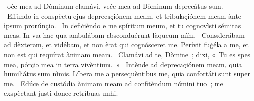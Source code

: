 \psalmChapterWithInscription{}
{ }
{%
~oċe mea ad Dòminum clamávi, voċe mea ad Dòminum deprecátus sum. 
~Effùndo in conspèctu ejus deprecaçiónem meam, et tribulaçiónem meam ànte ìpsum pronúnçio. 
~In defiċièndo e me spíritum meum, et tu cognovìsti sémitas meas. In via hac qua ambulábam absconduérunt làqueum mìhi. 
~Considerábam ad dèxteram, et vidébam, et non èrat qui cognósceret me. Perívit fuġéla a me, et non est qui requírat ànimam meam. 
~Clamávi ad te, Dòmine~; dixi, «~Tu es spes mea, pórçio mea in terra vivèntium.~»
~Intènde ad deprecaçiónem meam, quia humiliátus sum nìmis. Líbera me a persequèntibus me, quia confortáti sunt super me. 
~Edúce de custódia ànimam meam ad confitèndum nómini tuo~; me exspèctant justi donec retrìbuas mìhi. 
}
